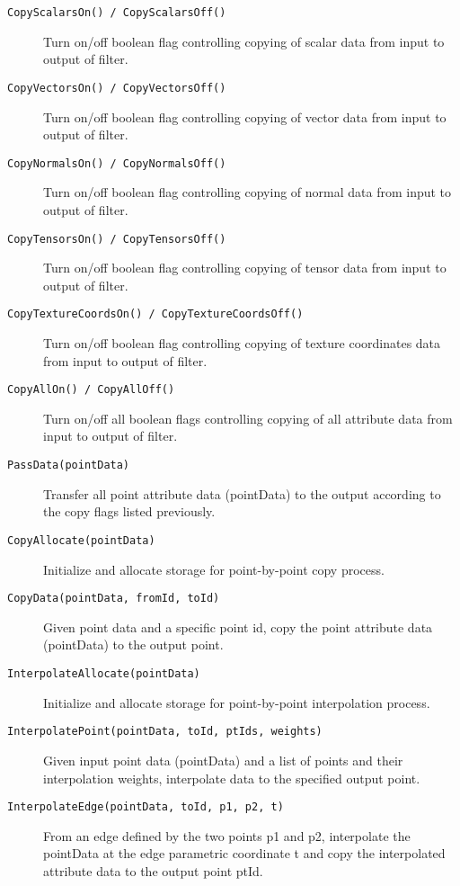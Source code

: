 \begin{description}[leftmargin=0cm,labelindent=0cm]
\begin{description}
    \item[\texttt{CopyScalarsOn() / CopyScalarsOff()}]
    Turn on/off boolean flag controlling copying of scalar data from input to output of filter.

    \item[\texttt{CopyVectorsOn() / CopyVectorsOff()}]
    Turn on/off boolean flag controlling copying of vector data from input to output of filter.

    \item[\texttt{CopyNormalsOn() / CopyNormalsOff()}]
    Turn on/off boolean flag controlling copying of normal data from input to output of filter.

    \item[\texttt{CopyTensorsOn() / CopyTensorsOff()}]
    Turn on/off boolean flag controlling copying of tensor data from input to output of filter.

    \item[\texttt{CopyTextureCoordsOn() / CopyTextureCoordsOff()}]
    Turn on/off boolean flag controlling copying of texture coordinates data from input to output of filter.

    \item[\texttt{CopyAllOn() / CopyAllOff()}]
    Turn on/off all boolean flags controlling copying of all attribute data from input to output of filter.

    \item[\texttt{PassData(pointData)}]
    Transfer all point attribute data (pointData) to the output according to the copy flags listed previously.

    \item[\texttt{CopyAllocate(pointData)}]
    Initialize and allocate storage for point-by-point copy process.

    \item[\texttt{CopyData(pointData, fromId, toId)}]
    Given point data and a specific point id, copy the point attribute data (pointData) to the output point.

    \item[\texttt{InterpolateAllocate(pointData)}]
    Initialize and allocate storage for point-by-point interpolation process.

    \item[\texttt{InterpolatePoint(pointData, toId, ptIds, weights)}]
    Given input point data (pointData) and a list of points and their interpolation weights, interpolate data to the specified output point.

    \item[\texttt{InterpolateEdge(pointData, toId, p1, p2, t)}]
    From an edge defined by the two points p1 and p2, interpolate the pointData at the edge parametric coordinate t and copy the interpolated attribute data to the output point ptId.


\end{description}
\end{description}
